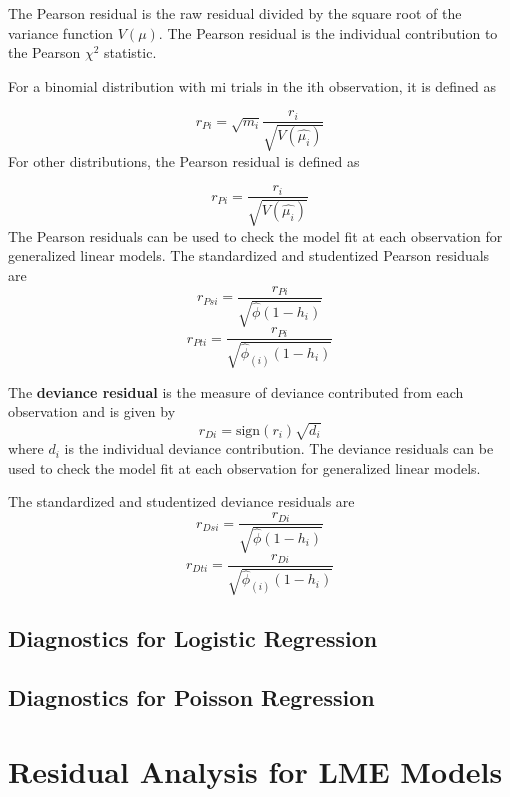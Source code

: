 \documentclass[12pt, a4paper]{article}
\theoremstyle{plain}
\theoremstyle{definition}
\theoremstyle{remark}
\begin{document}
The Pearson residual is the raw residual divided by the square root of the variance function $V(\mu).$
The Pearson residual is the individual contribution to the Pearson $\chi^2$ statistic. 

For a binomial distribution with mi trials in the ith observation, it is defined as

\[ r_{Pi} = \sqrt{ m_{i}}
 \frac{r_{i}}{\sqrt{V(\hat{ \mu_{i}})}} \]
For other distributions, the Pearson residual is defined as

\[ r_{Pi} = \frac{r_{i}}{\sqrt{V(\hat{ \mu_{i}})}}\]
The Pearson residuals can be used to check the model fit at each observation for generalized linear models. 
The standardized and studentized Pearson residuals are
\[
r_{Psi} = \frac{r_{Pi}}{\sqrt{\hat{ \phi} (1- h_{i})} } \]
\[ r_{Pti} = \frac{r_{Pi}}{\sqrt{ \hat{ \phi}_{(i)}
 (1- h_{i})} } \]



The \textbf{deviance residual} is the measure of deviance contributed from each observation and is given by
\[r_{Di} = \textrm{sign}( r_{i})
 \sqrt{ d_{i}}\]
where $d_i$ is the individual deviance contribution.
The deviance residuals can be used to check the model fit at each observation for generalized linear models. 


The standardized and studentized deviance residuals are
\[
r_{Dsi} = \frac{r_{Di}}{\sqrt{\hat{ \phi} (1- h_{i})} }\]
\[r_{Dti} = \frac{r_{Di}}{\sqrt{ \hat{ \phi}_{(i)}
 (1- h_{i})}}\]
 
\newpage
 
\subsection{Diagnostics for Logistic Regression}

\subsection{Diagnostics for Poisson Regression}
\newpage
\section{Residual Analysis for LME Models}
\end{document}
